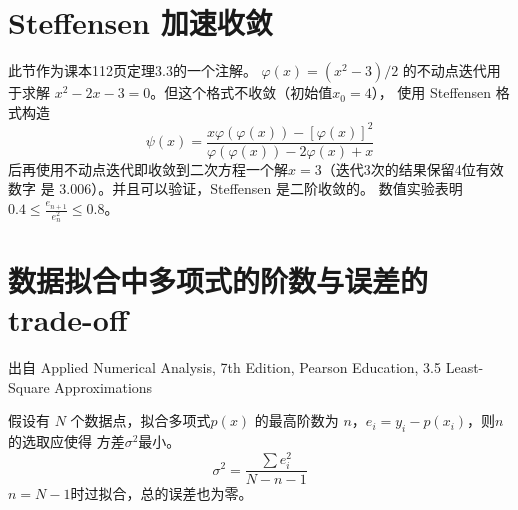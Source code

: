 \documentclass{article}
\begin{document}
\section{Steffensen 加速收敛}
此节作为课本112页定理3.3的一个注解。
$\varphi(x) = (x^2-3)/2$ 的不动点迭代用于求解
$x^2-2x-3=0$。但这个格式不收敛（初始值$x_0=4$），
使用
Steffensen 格式构造
\begin{equation}
    \psi(x) =     \frac{x\varphi(\varphi(x))
    - [\varphi(x)]^2}
    {\varphi(\varphi(x)) - 2\varphi(x) + x}
\end{equation}
后再使用不动点迭代即收敛到二次方程一个解$x=3$（迭代3次的结果保留4位有效数字
是 3.006）。并且可以验证，Steffensen 是二阶收敛的。
数值实验表明$0.4\leq \frac{e_{n+1}}{e^2_n} \leq 0.8$。
\section{数据拟合中多项式的阶数与误差的 trade-off}
出自 Applied Numerical Analysis, 7th Edition, Pearson Education, 3.5 Least-Square Approximations

假设有 $N$ 个数据点，拟合多项式$p(x)$
的最高阶数为 $n$，$e_i=y_i-p(x_i)$，则$n$的选取应使得
方差$\sigma^2$最小。
\begin{equation}
\sigma^2 = \frac{\sum e_i^2}{N-n-1}
\end{equation}
$n=N-1$时过拟合，总的误差也为零。
\end{document}
